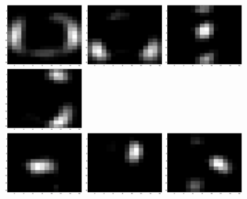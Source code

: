 \documentclass{article}
\begin{document}
\includegraphics[width=0.25\textwidth]{codebook5.eps}\hspace{0.03\textwidth}%
\includegraphics[width=0.25\textwidth]{codebook6.eps}\hspace{0.03\textwidth}%
\includegraphics[width=0.25\textwidth]{codebook7.eps}\hspace{0.03\textwidth}%
\includegraphics[width=0.25\textwidth]{codebook8.eps}\\[1em]
\includegraphics[width=0.25\textwidth]{codebook9.eps}\hspace{0.03\textwidth}%
\includegraphics[width=0.25\textwidth]{codebook10.eps}\hspace{0.03\textwidth}%
\includegraphics[width=0.25\textwidth]{codebook11.eps}\hspace{0.03\textwidth}%
\end{document}
